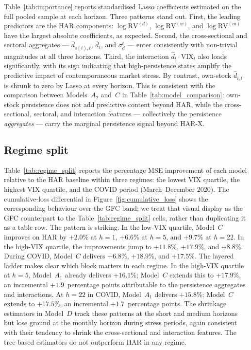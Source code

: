 \documentclass[11pt,a4paper]{article}
\newcommand{\RV}{\mathrm{RV}}
\newcommand{\VIX}{\mathrm{VIX}}
\newcommand{\dhat}{\hat d}
\begin{document}
Table~\ref{tab:importance} reports standardised Lasso coefficients
estimated on the full pooled sample at each horizon. Three patterns
stand out. First, the leading predictors are the HAR components:
$\log\RV^{(d)}$, $\log\RV^{(w)}$, and $\log\RV^{(m)}$ have the largest
absolute coefficients, as expected. Second, the cross-sectional and
sectoral aggregates --- $\overline d_{s(i),t}$, $\overline d_t$, and
$\sigma_d^t$ --- enter consistently with non-trivial magnitudes at all
three horizons. Third, the interaction $\dhat_t\!\cdot\!\VIX_t$ also
loads significantly, with its sign indicating that high-persistence
states amplify the predictive impact of contemporaneous market stress.
By contrast, own-stock $\dhat_{i,t}$ is shrunk to zero by Lasso at every
horizon. This is consistent with the comparison between Models~$A_2$
and~$C$ in Table~\ref{tab:model_comparison}: own-stock persistence does
not add predictive content beyond HAR, while the cross-sectional,
sectoral, and interaction features --- collectively the persistence
\emph{aggregates} --- carry the marginal persistence signal beyond
HAR-X.



\subsection{Regime split}
\label{subsec:regimes}

Table~\ref{tab:regime_split} reports the percentage MSE improvement of
each model relative to the HAR baseline within three regimes: the lowest
VIX quartile, the highest VIX quartile, and the COVID period
(March--December 2020). The cumulative-loss differential in
Figure~\ref{fig:cumulative_loss} shows the corresponding behaviour over
the GFC band; we treat that visual display as the GFC counterpart to the
Table~\ref{tab:regime_split} cells, rather than duplicating it as a
table row.
The pattern is striking. In the low-VIX quartile, Model~$C$ improves on
HAR by $+2.0\%$ at $h=1$, $+6.6\%$ at $h=5$, and $+9.7\%$ at $h=22$.
In the high-VIX quartile, the improvements jump to $+11.8\%$,
$+17.9\%$, and $+8.8\%$. During COVID, Model~$C$ delivers $+6.8\%$,
$+18.9\%$, and $+17.5\%$. The layered ladder makes clear which block
matters in each regime. In the high-VIX quartile at $h=5$, Model~$A_1$
already delivers $+16.1\%$; Model~$C$ extends this to $+17.9\%$, an
incremental $+1.9$~percentage points attributable to the persistence
aggregates and interactions. At $h=22$ in COVID, Model~$A_1$ delivers
$+15.8\%$; Model~$C$ extends to $+17.5\%$, an incremental
$+1.7$~percentage points. The shrinkage estimators in Model~$D$ track
these patterns at the short and medium horizons but lose ground at the
monthly horizon during stress periods, again consistent with their
tendency to shrink the cross-sectional and interaction features. The
tree-based estimators do not outperform HAR in any regime.
\end{document}
